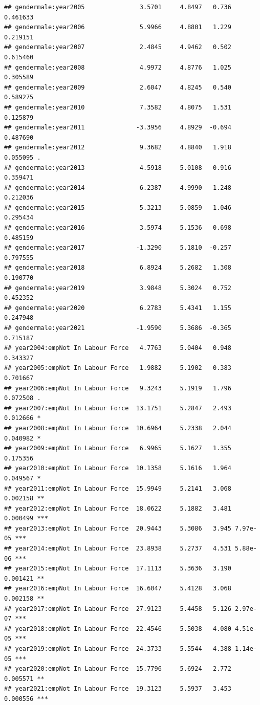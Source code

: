 \documentclass[
]{article}
\begin{document}
\begin{verbatim}
## gendermale:year2005               3.5701     4.8497   0.736 0.461633    
## gendermale:year2006               5.9966     4.8801   1.229 0.219151    
## gendermale:year2007               2.4845     4.9462   0.502 0.615460    
## gendermale:year2008               4.9972     4.8776   1.025 0.305589    
## gendermale:year2009               2.6047     4.8245   0.540 0.589275    
## gendermale:year2010               7.3582     4.8075   1.531 0.125879    
## gendermale:year2011              -3.3956     4.8929  -0.694 0.487690    
## gendermale:year2012               9.3682     4.8840   1.918 0.055095 .  
## gendermale:year2013               4.5918     5.0108   0.916 0.359471    
## gendermale:year2014               6.2387     4.9990   1.248 0.212036    
## gendermale:year2015               5.3213     5.0859   1.046 0.295434    
## gendermale:year2016               3.5974     5.1536   0.698 0.485159    
## gendermale:year2017              -1.3290     5.1810  -0.257 0.797555    
## gendermale:year2018               6.8924     5.2682   1.308 0.190770    
## gendermale:year2019               3.9848     5.3024   0.752 0.452352    
## gendermale:year2020               6.2783     5.4341   1.155 0.247948    
## gendermale:year2021              -1.9590     5.3686  -0.365 0.715187    
## year2004:empNot In Labour Force   4.7763     5.0404   0.948 0.343327    
## year2005:empNot In Labour Force   1.9882     5.1902   0.383 0.701667    
## year2006:empNot In Labour Force   9.3243     5.1919   1.796 0.072508 .  
## year2007:empNot In Labour Force  13.1751     5.2847   2.493 0.012666 *  
## year2008:empNot In Labour Force  10.6964     5.2338   2.044 0.040982 *  
## year2009:empNot In Labour Force   6.9965     5.1627   1.355 0.175356    
## year2010:empNot In Labour Force  10.1358     5.1616   1.964 0.049567 *  
## year2011:empNot In Labour Force  15.9949     5.2141   3.068 0.002158 ** 
## year2012:empNot In Labour Force  18.0622     5.1882   3.481 0.000499 ***
## year2013:empNot In Labour Force  20.9443     5.3086   3.945 7.97e-05 ***
## year2014:empNot In Labour Force  23.8938     5.2737   4.531 5.88e-06 ***
## year2015:empNot In Labour Force  17.1113     5.3636   3.190 0.001421 ** 
## year2016:empNot In Labour Force  16.6047     5.4128   3.068 0.002158 ** 
## year2017:empNot In Labour Force  27.9123     5.4458   5.126 2.97e-07 ***
## year2018:empNot In Labour Force  22.4546     5.5038   4.080 4.51e-05 ***
## year2019:empNot In Labour Force  24.3733     5.5544   4.388 1.14e-05 ***
## year2020:empNot In Labour Force  15.7796     5.6924   2.772 0.005571 ** 
## year2021:empNot In Labour Force  19.3123     5.5937   3.453 0.000556 ***

\end{verbatim}
\end{document}
